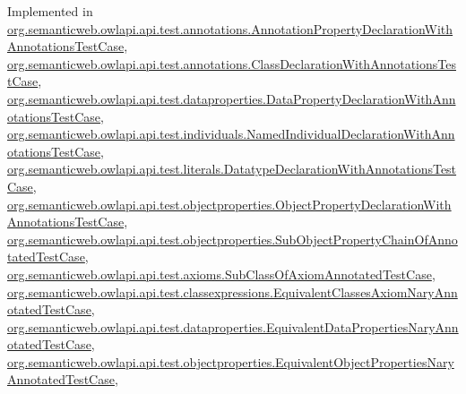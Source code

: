 Implemented in \hyperlink{classorg_1_1semanticweb_1_1owlapi_1_1api_1_1test_1_1annotations_1_1_annotation_property_declaration_with_annotations_test_case_ae206d9e46845461a321ed6707d67ab5a}{org.\-semanticweb.\-owlapi.\-api.\-test.\-annotations.\-Annotation\-Property\-Declaration\-With\-Annotations\-Test\-Case}, \hyperlink{classorg_1_1semanticweb_1_1owlapi_1_1api_1_1test_1_1annotations_1_1_class_declaration_with_annotations_test_case_ab0cc65f04eb1ad84a884d1f9f0ca6c74}{org.\-semanticweb.\-owlapi.\-api.\-test.\-annotations.\-Class\-Declaration\-With\-Annotations\-Test\-Case}, \hyperlink{classorg_1_1semanticweb_1_1owlapi_1_1api_1_1test_1_1dataproperties_1_1_data_property_declaration_with_annotations_test_case_acdf9852c9a6267d75ab5e4e1b3931749}{org.\-semanticweb.\-owlapi.\-api.\-test.\-dataproperties.\-Data\-Property\-Declaration\-With\-Annotations\-Test\-Case}, \hyperlink{classorg_1_1semanticweb_1_1owlapi_1_1api_1_1test_1_1individuals_1_1_named_individual_declaration_with_annotations_test_case_a498505e686bf21dd9b10f9a2b678cf7e}{org.\-semanticweb.\-owlapi.\-api.\-test.\-individuals.\-Named\-Individual\-Declaration\-With\-Annotations\-Test\-Case}, \hyperlink{classorg_1_1semanticweb_1_1owlapi_1_1api_1_1test_1_1literals_1_1_datatype_declaration_with_annotations_test_case_a4c0bbeee66c18185943a032e3dba8c70}{org.\-semanticweb.\-owlapi.\-api.\-test.\-literals.\-Datatype\-Declaration\-With\-Annotations\-Test\-Case}, \hyperlink{classorg_1_1semanticweb_1_1owlapi_1_1api_1_1test_1_1objectproperties_1_1_object_property_declaration_with_annotations_test_case_ab2a01d9d9f7991e9632b78c3ad9a0cce}{org.\-semanticweb.\-owlapi.\-api.\-test.\-objectproperties.\-Object\-Property\-Declaration\-With\-Annotations\-Test\-Case}, \hyperlink{classorg_1_1semanticweb_1_1owlapi_1_1api_1_1test_1_1objectproperties_1_1_sub_object_property_chain_of_annotated_test_case_a0991c15d4d2d9c3374c63208a5f355de}{org.\-semanticweb.\-owlapi.\-api.\-test.\-objectproperties.\-Sub\-Object\-Property\-Chain\-Of\-Annotated\-Test\-Case}, \hyperlink{classorg_1_1semanticweb_1_1owlapi_1_1api_1_1test_1_1axioms_1_1_sub_class_of_axiom_annotated_test_case_a3c5e7fae82a759d3f78d3b02093cf0ba}{org.\-semanticweb.\-owlapi.\-api.\-test.\-axioms.\-Sub\-Class\-Of\-Axiom\-Annotated\-Test\-Case}, \hyperlink{classorg_1_1semanticweb_1_1owlapi_1_1api_1_1test_1_1classexpressions_1_1_equivalent_classes_axiom_nary_annotated_test_case_ac11d3ff642e280727ab61870bf7fc85c}{org.\-semanticweb.\-owlapi.\-api.\-test.\-classexpressions.\-Equivalent\-Classes\-Axiom\-Nary\-Annotated\-Test\-Case}, \hyperlink{classorg_1_1semanticweb_1_1owlapi_1_1api_1_1test_1_1dataproperties_1_1_equivalent_data_properties_nary_annotated_test_case_af48c30ccd10b6bd8b82673bd20fdfebb}{org.\-semanticweb.\-owlapi.\-api.\-test.\-dataproperties.\-Equivalent\-Data\-Properties\-Nary\-Annotated\-Test\-Case}, \hyperlink{classorg_1_1semanticweb_1_1owlapi_1_1api_1_1test_1_1objectproperties_1_1_equivalent_object_properties_nary_annotated_test_case_a19e9b79646b37f3c4b4300328bae6ad0}{org.\-semanticweb.\-owlapi.\-api.\-test.\-objectproperties.\-Equivalent\-Object\-Properties\-Nary\-Annotated\-Test\-Case}, 